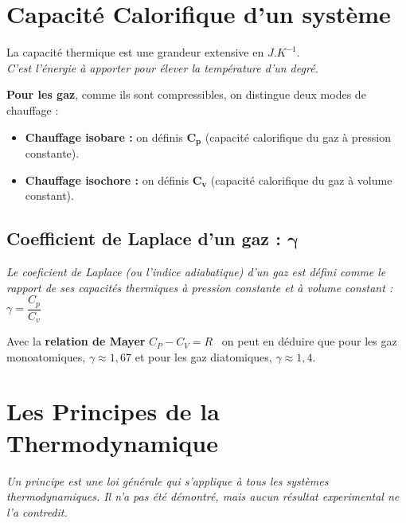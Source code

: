 \documentclass[a4paper,12pt]{article}
\begin{document}
\clearpage

\section{Capacité Calorifique d'un système}

    La capacité thermique est une grandeur extensive en $J.K^{-1}$.\\
    \textit{C'est l'énergie à apporter pour élever la température d'un degré.}
    \vspace{3mm}

    \textbf{Pour les gaz}, comme ils sont compressibles, on distingue deux modes de chauffage :
    \vspace{3pt}
    \begin{itemize}[label=\textbullet]
        \item \textbf{Chauffage isobare :} on définis $\bm{C_p}$ (capacité calorifique du gaz à pression constante).
        \item \textbf{Chauffage isochore :} on définis $\bm{C_v}$ (capacité calorifique du gaz à volume constant).
    \end{itemize}

    \subsection*{Coefficient de Laplace d'un gaz : $\bm{\gamma}$}

    \textit{Le coeficient de Laplace (ou l'indice adiabatique) d'un gaz est défini comme le rapport de
    ses capacités thermiques à pression constante et à volume constant :} $\boxed{\gamma = \dfrac{C_p}{C_v}}$

    Avec la \textbf{relation de Mayer} $C_P - C_V = R$ \ on peut en déduire que pour les gaz monoatomiques, $\gamma \approx 1,67$ et pour les gaz diatomiques, $\gamma \approx 1,4$.




\section{Les Principes de la Thermodynamique}

    \textit{Un principe est une loi générale qui s'applique à tous les systèmes thermodynamiques. Il n'a pas été démontré, mais aucun résultat experimental ne l'a contredit.}
\end{document}
